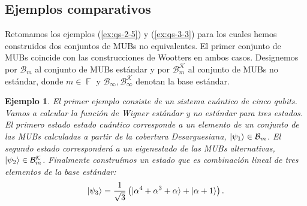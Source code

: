 \documentclass[a4paper,11pt]{report}
\DeclareMathOperator{\F}{\mathbb{F}}
\newtheorem{example}{Ejemplo}
\begin{document}
  \subsection{Ejemplos comparativos} 

  Retomamos los ejemplos (\ref{ex:qs-2-5}) y
  (\ref{ex:qs-3-3}) para los cuales hemos construidos dos
  conjuntos de MUBs no equivalentes. El primer conjunto de
  MUBs coincide con las construcciones de Wootters en ambos
  casos. Designemos por $\mathcal B_m$ al conjunto de MUBs
  estándar y por $\mathcal B_m^{\mathcal K}$ al conjunto de
  MUBs no estándar, donde $m \in \F$ y $\mathcal B_\infty,
  \mathcal B_\infty^{\mathcal K}$ denotan la base estándar.

  \begin{example}
    El primer ejemplo consiste de un sistema cuántico de
    cinco qubits. Vamos a calcular la función de Wigner
    estándar y no estándar para tres estados. El primero
    estado estado cuántico corresponde a un elemento de un
    conjunto de las MUBs calculadas a partir de la cobertura
    Desarguesiana, $\ket{\psi_1} \in \mathcal B_m$. El
    segundo estado corresponderá a un eigenestado de las
    MUBs alternativas, $\ket{\psi_2} \in \mathcal
    B_m^{\mathcal K}$. Finalmente construímos un estado que
    es combinación lineal de tres elementos de la base
    estándar:
    \[
      \ket{\psi_3}
      = \frac{1}{\sqrt{3}} \left(
        \ket{\alpha^{4} + \alpha^3 + \alpha}
        + 
        \ket{\alpha+1}
      \right).
    \] 
  \end{example}
\end{document}

